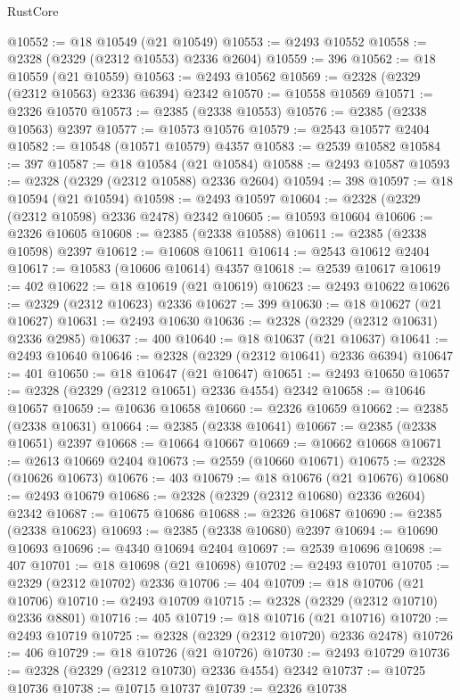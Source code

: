 \begin{lexlean}{RustCore}
\begin{coremodule}
@10552 := @18 @10549 (@21 @10549)
@10553 := @2493 @10552
@10558 := @2328 (@2329 (@2312 @10553) @2336 @2604)
@10559 := 396
@10562 := @18 @10559 (@21 @10559)
@10563 := @2493 @10562
@10569 := @2328 (@2329 (@2312 @10563) @2336 @6394) @2342
@10570 := @10558 @10569
@10571 := @2326 @10570
@10573 := @2385 (@2338 @10553)
@10576 := @2385 (@2338 @10563) @2397
@10577 := @10573 @10576
@10579 := @2543 @10577 @2404
@10582 := @10548 (@10571 @10579) @4357
@10583 := @2539 @10582
@10584 := 397
@10587 := @18 @10584 (@21 @10584)
@10588 := @2493 @10587
@10593 := @2328 (@2329 (@2312 @10588) @2336 @2604)
@10594 := 398
@10597 := @18 @10594 (@21 @10594)
@10598 := @2493 @10597
@10604 := @2328 (@2329 (@2312 @10598) @2336 @2478) @2342
@10605 := @10593 @10604
@10606 := @2326 @10605
@10608 := @2385 (@2338 @10588)
@10611 := @2385 (@2338 @10598) @2397
@10612 := @10608 @10611
@10614 := @2543 @10612 @2404
@10617 := @10583 (@10606 @10614) @4357
@10618 := @2539 @10617
@10619 := 402
@10622 := @18 @10619 (@21 @10619)
@10623 := @2493 @10622
@10626 := @2329 (@2312 @10623) @2336
@10627 := 399
@10630 := @18 @10627 (@21 @10627)
@10631 := @2493 @10630
@10636 := @2328 (@2329 (@2312 @10631) @2336 @2985)
@10637 := 400
@10640 := @18 @10637 (@21 @10637)
@10641 := @2493 @10640
@10646 := @2328 (@2329 (@2312 @10641) @2336 @6394)
@10647 := 401
@10650 := @18 @10647 (@21 @10647)
@10651 := @2493 @10650
@10657 := @2328 (@2329 (@2312 @10651) @2336 @4554) @2342
@10658 := @10646 @10657
@10659 := @10636 @10658
@10660 := @2326 @10659
@10662 := @2385 (@2338 @10631)
@10664 := @2385 (@2338 @10641)
@10667 := @2385 (@2338 @10651) @2397
@10668 := @10664 @10667
@10669 := @10662 @10668
@10671 := @2613 @10669 @2404
@10673 := @2559 (@10660 @10671)
@10675 := @2328 (@10626 @10673)
@10676 := 403
@10679 := @18 @10676 (@21 @10676)
@10680 := @2493 @10679
@10686 := @2328 (@2329 (@2312 @10680) @2336 @2604) @2342
@10687 := @10675 @10686
@10688 := @2326 @10687
@10690 := @2385 (@2338 @10623)
@10693 := @2385 (@2338 @10680) @2397
@10694 := @10690 @10693
@10696 := @4340 @10694 @2404
@10697 := @2539 @10696
@10698 := 407
@10701 := @18 @10698 (@21 @10698)
@10702 := @2493 @10701
@10705 := @2329 (@2312 @10702) @2336
@10706 := 404
@10709 := @18 @10706 (@21 @10706)
@10710 := @2493 @10709
@10715 := @2328 (@2329 (@2312 @10710) @2336 @8801)
@10716 := 405
@10719 := @18 @10716 (@21 @10716)
@10720 := @2493 @10719
@10725 := @2328 (@2329 (@2312 @10720) @2336 @2478)
@10726 := 406
@10729 := @18 @10726 (@21 @10726)
@10730 := @2493 @10729
@10736 := @2328 (@2329 (@2312 @10730) @2336 @4554) @2342
@10737 := @10725 @10736
@10738 := @10715 @10737
@10739 := @2326 @10738

\end{coremodule}
\end{lexlean}
